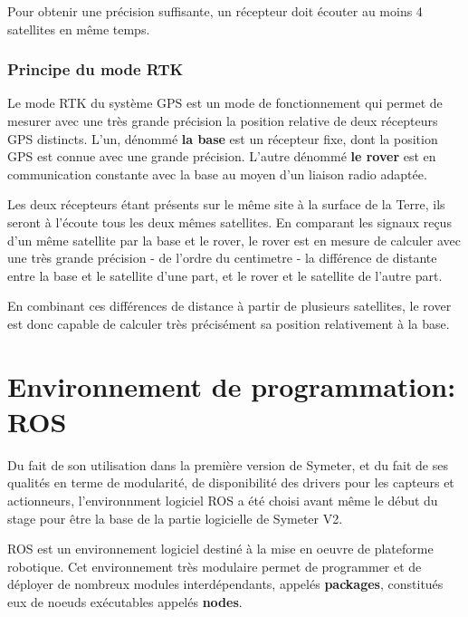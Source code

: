\documentclass[12pt,a4paper]{report}
\begin{document}
		\para Pour obtenir une précision suffisante, un récepteur doit écouter au moins 4 satellites en même temps.
		
		
		\subsubsection{Principe du mode RTK}
		Le mode RTK du système GPS est un mode de fonctionnement qui permet de mesurer avec une très grande précision la position relative de deux récepteurs GPS distincts. L'un, dénommé \textbf{la base} est un récepteur fixe, dont la position GPS est connue avec une grande précision. L'autre dénommé \textbf{le rover} est en communication constante avec la base au moyen d'un liaison radio adaptée.
		
		\para Les deux récepteurs étant présents sur le même site à la surface de la Terre, ils seront à l'écoute tous les deux mêmes satellites. En comparant les signaux reçus d'un même satellite par la base et le rover, le rover est en mesure de calculer avec une très grande précision - de l'ordre du centimetre - la différence de distante entre la base et le satellite d'une part, et le rover et le satellite de l'autre part. 
		
		
		\para En combinant ces différences de distance à partir de plusieurs satellites, le rover est donc capable de calculer très précisément sa position relativement à la base.
	
		
		
		
		
		
	\section{Environnement de programmation: ROS}
	Du fait de son utilisation dans la première version de Symeter, et du fait de ses qualités en terme de modularité, de disponibilité des drivers pour les capteurs et actionneurs, l'environnment logiciel ROS a été choisi avant même le début du stage pour être la base de la partie logicielle de Symeter V2.
	
	
	\para ROS est un environnement logiciel destiné à la mise en oeuvre de plateforme robotique. Cet environnement très modulaire permet de programmer et de déployer de nombreux modules interdépendants, appelés \textbf{packages}, constitués eux de noeuds exécutables appelés \textbf{nodes}.
	
\end{document}
